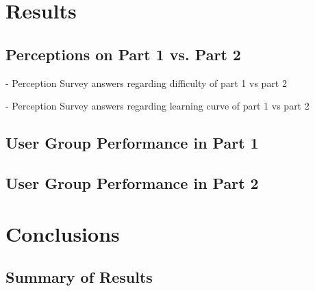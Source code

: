 \section{Results}





\subsection{Perceptions on Part 1 vs. Part 2}

- Perception Survey answers regarding difficulty of part 1 vs part 2

- Perception Survey answers regarding learning curve of part 1 vs part 2

\subsection{User Group Performance in Part 1}


\subsection{User Group Performance in Part 2}



\section{Conclusions}

\subsection{Summary of Results}

